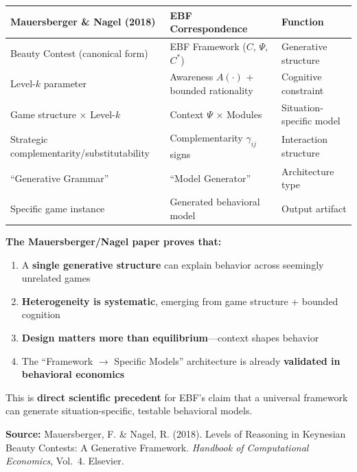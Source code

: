 \begin{center}
\renewcommand{\arraystretch}{1.4}
\begin{tabular}{@{}p{5cm}p{5cm}p{3.5cm}@{}}
\toprule
\textbf{Mauersberger \& Nagel (2018)} & \textbf{EBF Correspondence} & \textbf{Function} \\
\midrule
Beauty Contest (canonical form) & EBF Framework ($C$, $\Psi$, $C^*$) & Generative structure \\
Level-$k$ parameter & Awareness $A(\cdot)$ + bounded rationality & Cognitive constraint \\
Game structure $\times$ Level-$k$ & Context $\Psi$ $\times$ Modules & Situation-specific model \\
Strategic complementarity/substitutability & Complementarity $\gamma_{ij}$ signs & Interaction structure \\
``Generative Grammar'' & ``Model Generator'' & Architecture type \\
Specific game instance & Generated behavioral model & Output artifact \\
\bottomrule
\end{tabular}
\end{center}

\begin{tcolorbox}[colback=red!5!white, colframe=red!75!black,
    title=\textbf{Why This Paper Is Critical for EBF}]

\textbf{The Mauersberger/Nagel paper proves that:}
\begin{enumerate}[nosep]
    \item A \textbf{single generative structure} can explain behavior across seemingly unrelated games
    \item \textbf{Heterogeneity is systematic}, emerging from game structure + bounded cognition
    \item \textbf{Design matters more than equilibrium}---context shapes behavior
    \item The ``Framework $\rightarrow$ Specific Models'' architecture is already \textbf{validated in behavioral economics}
\end{enumerate}

This is \textbf{direct scientific precedent} for EBF's claim that a universal framework can
generate situation-specific, testable behavioral models.

\textbf{Source:} Mauersberger, F. \& Nagel, R. (2018). Levels of Reasoning in Keynesian Beauty
Contests: A Generative Framework. \textit{Handbook of Computational Economics}, Vol.\ 4. Elsevier.

\end{tcolorbox}

